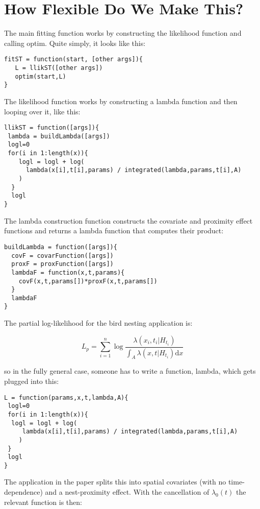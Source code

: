 \documentclass{article}
\begin{document}
\section*{How Flexible Do We Make This?}


The main fitting function works by constructing the likelihood function and calling optim. Quite simply,
it looks like this:

\begin{verbatim}
fitST = function(start, [other args]){
   L = llikST([other args])
   optim(start,L)
}
\end{verbatim}

The likelihood function works by constructing a lambda function and then looping over it, like this:

\begin{verbatim}
llikST = function([args]){
 lambda = buildLambda([args])
 logl=0
 for(i in 1:length(x)){
    logl = logl + log( 
      lambda(x[i],t[i],params) / integrated(lambda,params,t[i],A)
    )
  }
  logl
}
\end{verbatim}

The lambda construction function constructs the covariate and proximity effect functions and returns
a lambda function that computes their product:

\begin{verbatim}
buildLambda = function([args]){
  covF = covarFunction([args])
  proxF = proxFunction([args])
  lambdaF = function(x,t,params){
    covF(x,t,params[])*proxF(x,t,params[])
  }
  lambdaF
}
\end{verbatim}

The partial log-likelihood for the bird nesting application is:

$$
L_p = \sum^n_{i=1} \log \frac{\lambda(x_i,t_i|H_{t_i})}{\int_A \lambda(x,t|H_{t_i}) \mathrm{d}x}
$$

so in the fully general case, someone has to write a function, lambda, which gets plugged into this:

\begin{verbatim}
L = function(params,x,t,lambda,A){
 logl=0
 for(i in 1:length(x)){
  logl = logl + log( 
     lambda(x[i],t[i],params) / integrated(lambda,params,t[i],A)
    )
 }
 logl
}
\end{verbatim}

The application in the paper splits this into spatial covariates (with no time-dependence) and a nest-proximity effect. With the 
cancellation of $\lambda_0(t)$ the relevant function is then:
\end{document}
